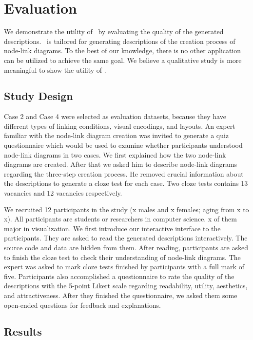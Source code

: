 \section{Evaluation}
We demonstrate the utility of \ApproachName~by evaluating the quality of the generated descriptions.
\ApproachName~is tailored for generating descriptions of the creation process of node-link diagrams.
To the best of our knowledge, there is no other application can be utilized to achieve the same goal.
We believe a qualitative study is more meaningful to show the utility of \ApproachName.

\subsection{Study Design}
Case 2 and Case 4 were selected as evaluation datasets,
because they have different types of linking conditions, visual encodings, and layouts.
An expert familiar with the node-link diagram creation was invited to generate a quiz questionnaire which would be used to examine whether participants understood node-link diagrams in two cases.
We first explained how the two node-link diagrams are created.
After that we asked him to describe node-link diagrams regarding the three-step creation process.
He removed crucial information about the descriptions to generate a cloze test for each case.
Two cloze tests contains 13 vacancies and 12 vacancies respectively.

We recruited 12 participants in the study ({\color{red}x} males and {\color{red}x} females; aging from {\color{red}x} to {\color{red}x}).
All participants are students or researchers in computer science.
{\color{red}x} of them major in visualization.
We first introduce our interactive interface to the participants.
They are asked to read the generated descriptions interactively.
The source code and data are hidden from them.
After reading, participants are asked to finish the cloze test to check their understanding of node-link diagrams.
The expert was asked to mark cloze tests finished by participants with a full mark of five.
Participants also accomplished a questionnaire to rate the quality of the descriptions with the 5-point Likert scale regarding readability, utility, aesthetics, and attractiveness.
After they finished the questionnaire, we asked them some open-ended questions for feedback and explanations.



\subsection{Results}